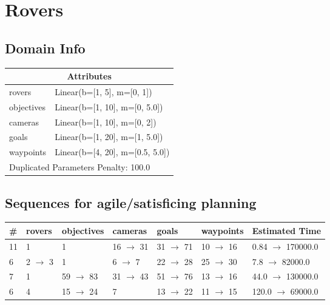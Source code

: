 \documentclass{article}
\begin{document}
                            \newpage \section{Rovers}
                    \subsection*{Domain Info}

                    \begin{center}
                    \begin{tabular}{@{}p{}p{}@{}}
                    \multicolumn{2}{c}{\bf \large Attributes}\\\midrule
                    rovers & Linear(b=[1, 5], m=[0, 1])\\
objectives & Linear(b=[1, 10], m=[0, 5.0])\\
cameras & Linear(b=[1, 10], m=[0, 2])\\
goals & Linear(b=[1, 20], m=[1, 5.0])\\
waypoints & Linear(b=[4, 20], m=[0.5, 5.0])
                    
                     \\\midrule
                    \multicolumn{2}{l}{Duplicated Parameters Penalty: 100.0}
                    \end{tabular}
                    \end{center}
                
                         \subsection*{Sequences for agile/satisficing planning}

                        \begin{center}
                        \begin{tabular}{@{}l|l|l|l|l|l|l@{}}
                        \# & rovers & objectives & cameras & goals & waypoints & Estimated Time\\\midrule
                        11&1&1&16 $\rightarrow$ 31&31 $\rightarrow$ 71&10 $\rightarrow$ 16&0.84 $\rightarrow$ 170000.0\\
6&2 $\rightarrow$ 3&1&6 $\rightarrow$ 7&22 $\rightarrow$ 28&25 $\rightarrow$ 30&7.8 $\rightarrow$ 82000.0\\
7&1&59 $\rightarrow$ 83&31 $\rightarrow$ 43&51 $\rightarrow$ 76&13 $\rightarrow$ 16&44.0 $\rightarrow$ 130000.0\\
6&4&15 $\rightarrow$ 24&7&13 $\rightarrow$ 22&11 $\rightarrow$ 15&120.0 $\rightarrow$ 69000.0
                        \end{tabular}
                        \end{center}
                    
\end{document}
